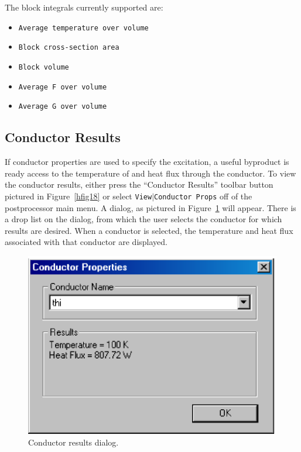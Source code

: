 The block integrals currently supported are:

\begin{itemize}

\item \texttt{Average temperature over volume}

\item \texttt{Block cross-section area}

\item \texttt{Block volume}

\item \texttt{Average F over volume}

\item \texttt{Average G over volume}

\end{itemize}

\subsection{Conductor Results}

If conductor properties are used to specify the excitation, a
useful byproduct is ready access to the temperature of and heat flux through the
conductor. To view the conductor results, either press the ``Conductor Results''
toolbar button pictured in Figure~\ref{hfig18} or select \texttt{View$\vert
$Conductor Props} off of the postprocessor main menu. A dialog, as
pictured in Figure~\ref{hfig21} will appear. There is a drop list on the
dialog, from which the user selects the conductor for which results
are desired. When a conductor is selected, the temperature and heat flux
associated with that conductor are displayed.

\begin{figure}[htbp]
\centerline{\includegraphics{hcircres.ps}}
\caption{Conductor results dialog.}
\label{hfig21}
\end{figure}

